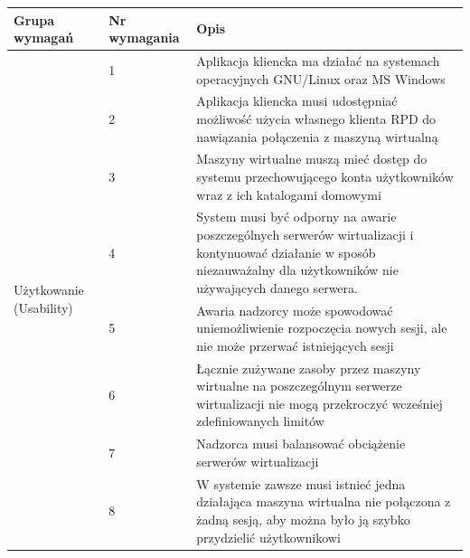 \documentclass[12pt]{article}
\begin{document}
\begin{center}
	\begin{table}[h!]
		\begin{tabular}{|p{}|p{}|p{}|}
			\hline Grupa wymagań                            & Nr wymagania & Opis                                                                                                                                                                    \\ \hline
			\multirow[t]{8}{=}{Użytkowanie (Usability)}     & 1            & Aplikacja kliencka ma działać na systemach operacyjnych GNU/Linux oraz MS Windows                                                                                       \\ \cline{2-3}
			                                                & 2            & Aplikacja kliencka musi udostępniać możliwość użycia własnego klienta RPD do nawiązania połączenia z maszyną wirtualną                                                  \\ \cline{2-3}
			                                                & 3            & Maszyny wirtualne muszą mieć dostęp do systemu przechowującego konta użytkowników wraz z ich katalogami domowymi                                                        \\ \hline
			\multirow[t]{7}{=}{Niezawodność (Reliability)}  & 4            & System musi być odporny na awarie poszczególnych serwerów wirtualizacji i kontynuować działanie w sposób niezauważalny dla użytkowników nie używających danego serwera. \\ \cline{2-3}
			                                                & 5            & Awaria nadzorcy może spowodować uniemożliwienie rozpoczęcia nowych sesji, ale nie może przerwać istniejących sesji                                                      \\ \hline
			\multirow[t]{10}{=}{Wydajność (Performance)}    & 6            & Łącznie zużywane zasoby przez maszyny wirtualne na poszczególnym serwerze wirtualizacji nie mogą przekroczyć wcześniej zdefiniowanych limitów                           \\ \cline{2-3}
			                                                & 7            & Nadzorca musi balansować obciążenie serwerów wirtualizacji                                                                                                              \\ \cline{2-3}
			                                                & 8            & W systemie zawsze musi istnieć jedna działająca maszyna wirtualna nie połączona z żadną sesją, aby można było ją szybko przydzielić użytkownikowi                       \\ \cline{2-3}

\end{tabular}
\end{table}
\end{center}
\end{document}
